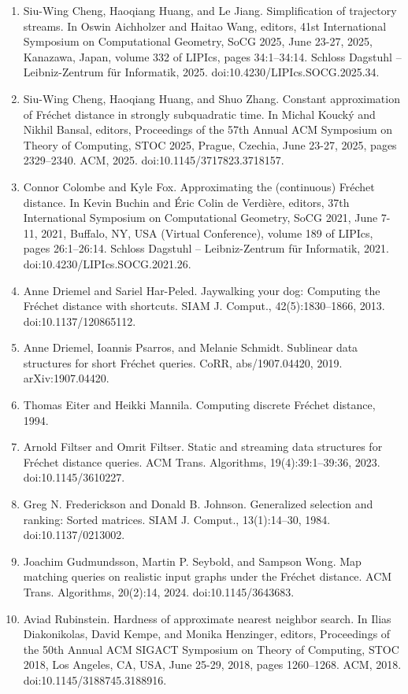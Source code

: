 \begin{enumerate}
\item[]  [16]  Siu-Wing Cheng, Haoqiang Huang, and Le Jiang.  Simplification of trajectory streams.  In Oswin Aichholzer and Haitao Wang, editors, 41st International Symposium on Computational Geometry, SoCG 2025, June 23-27, 2025, Kanazawa, Japan, volume 332 of LIPIcs, pages 34:1–34:14. Schloss Dagstuhl – Leibniz-Zentrum für Informatik, 2025.  doi:10.4230/LIPIcs.SOCG.2025.34.  
\item[]  [17]  Siu-Wing Cheng, Haoqiang Huang, and Shuo Zhang.  Constant approximation of Fréchet distance in strongly subquadratic time.  In Michal Koucký and Nikhil Bansal, editors, Proceedings of the 57th Annual ACM Symposium on Theory of Computing, STOC 2025, Prague, Czechia, June 23-27, 2025, pages 2329–2340. ACM, 2025.  doi:10.1145/3717823.3718157.  
\item[]  [18]  Connor Colombe and Kyle Fox.  Approximating the (continuous) Fréchet distance.  In Kevin Buchin and Éric Colin de Verdière, editors, 37th International Symposium on Computational Geometry, SoCG 2021, June 7-11, 2021, Buffalo, NY, USA (Virtual Conference), volume 189 of LIPIcs, pages 26:1–26:14. Schloss Dagstuhl – Leibniz-Zentrum für Informatik, 2021.  doi:10.4230/LIPIcs.SOCG.2021.26.  
\item[]  [19]  Anne Driemel and Sariel Har-Peled.  Jaywalking your dog: Computing the Fréchet distance with shortcuts.  SIAM J. Comput., 42(5):1830–1866, 2013.  doi:10.1137/120865112.  
\item[]  [20]  Anne Driemel, Ioannis Psarros, and Melanie Schmidt.  Sublinear data structures for short Fréchet queries.  CoRR, abs/1907.04420, 2019.  arXiv:1907.04420.  
\item[]  [21]  Thomas Eiter and Heikki Mannila.  Computing discrete Fréchet distance, 1994.  
\item[]  [22]  Arnold Filtser and Omrit Filtser.  Static and streaming data structures for Fréchet distance queries.  ACM Trans. Algorithms, 19(4):39:1–39:36, 2023.  doi:10.1145/3610227.  
\item[]  [23]  Greg N. Frederickson and Donald B. Johnson.  Generalized selection and ranking: Sorted matrices.  SIAM J. Comput., 13(1):14–30, 1984.  doi:10.1137/0213002.  
\item[]  [24]  Joachim Gudmundsson, Martin P. Seybold, and Sampson Wong.  Map matching queries on realistic input graphs under the Fréchet distance.  ACM Trans. Algorithms, 20(2):14, 2024.  doi:10.1145/3643683.  
\item[]  [25]  Aviad Rubinstein.  Hardness of approximate nearest neighbor search.  In Ilias Diakonikolas, David Kempe, and Monika Henzinger, editors, Proceedings of the 50th Annual ACM SIGACT Symposium on Theory of Computing, STOC 2018, Los Angeles, CA, USA, June 25-29, 2018, pages 1260–1268. ACM, 2018.  doi:10.1145/3188745.3188916.  

\end{enumerate}
